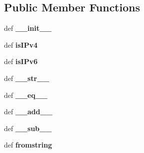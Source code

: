 \subsection*{Public Member Functions}
\begin{DoxyCompactItemize}
\item 
\hypertarget{classcore_1_1misc_1_1ipaddr_1_1_i_p_addr_a0351442cc90864b2e9979c096c9fe93b}{def {\bfseries \+\_\+\+\_\+init\+\_\+\+\_\+}}\label{classcore_1_1misc_1_1ipaddr_1_1_i_p_addr_a0351442cc90864b2e9979c096c9fe93b}

\item 
\hypertarget{classcore_1_1misc_1_1ipaddr_1_1_i_p_addr_adf77e78161a5ed70875ac1beef821ecd}{def {\bfseries is\+I\+Pv4}}\label{classcore_1_1misc_1_1ipaddr_1_1_i_p_addr_adf77e78161a5ed70875ac1beef821ecd}

\item 
\hypertarget{classcore_1_1misc_1_1ipaddr_1_1_i_p_addr_a9104094ace69b1c5f03704a1faa25dd5}{def {\bfseries is\+I\+Pv6}}\label{classcore_1_1misc_1_1ipaddr_1_1_i_p_addr_a9104094ace69b1c5f03704a1faa25dd5}

\item 
\hypertarget{classcore_1_1misc_1_1ipaddr_1_1_i_p_addr_aa1e65517645328cecc48dc9b7ceceb92}{def {\bfseries \+\_\+\+\_\+str\+\_\+\+\_\+}}\label{classcore_1_1misc_1_1ipaddr_1_1_i_p_addr_aa1e65517645328cecc48dc9b7ceceb92}

\item 
\hypertarget{classcore_1_1misc_1_1ipaddr_1_1_i_p_addr_a4ea69ec659677af1f2926fb25489d0ac}{def {\bfseries \+\_\+\+\_\+eq\+\_\+\+\_\+}}\label{classcore_1_1misc_1_1ipaddr_1_1_i_p_addr_a4ea69ec659677af1f2926fb25489d0ac}

\item 
\hypertarget{classcore_1_1misc_1_1ipaddr_1_1_i_p_addr_a01b86459f46184341696b22f86ad2e94}{def {\bfseries \+\_\+\+\_\+add\+\_\+\+\_\+}}\label{classcore_1_1misc_1_1ipaddr_1_1_i_p_addr_a01b86459f46184341696b22f86ad2e94}

\item 
\hypertarget{classcore_1_1misc_1_1ipaddr_1_1_i_p_addr_a6740d95fe25d772cf4f1ada1494c91d2}{def {\bfseries \+\_\+\+\_\+sub\+\_\+\+\_\+}}\label{classcore_1_1misc_1_1ipaddr_1_1_i_p_addr_a6740d95fe25d772cf4f1ada1494c91d2}

\item 
\hypertarget{classcore_1_1misc_1_1ipaddr_1_1_i_p_addr_a6c353f8d9b20f063d4b881d44644b6a8}{def {\bfseries fromstring}}\label{classcore_1_1misc_1_1ipaddr_1_1_i_p_addr_a6c353f8d9b20f063d4b881d44644b6a8}

\end{DoxyCompactItemize}
